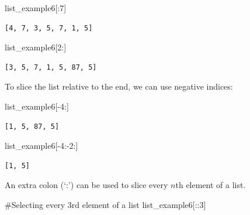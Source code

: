 \documentclass[
  letterpaper,
  DIV=11,
  numbers=noendperiod]{scrreprt}
\newenvironment{Shaded}{\begin{snugshade}}{\end{snugshade}}
\newcommand{\CommentTok}[1]{\textcolor[rgb]{0.37,0.37,0.37}{#1}}
\newcommand{\DecValTok}[1]{\textcolor[rgb]{0.68,0.00,0.00}{#1}}
\newcommand{\NormalTok}[1]{\textcolor[rgb]{0.00,0.23,0.31}{#1}}
\newcommand{\OperatorTok}[1]{\textcolor[rgb]{0.37,0.37,0.37}{#1}}
\begin{document}
\begin{Shaded}
\begin{Highlighting}[]
\NormalTok{list\_example6[:}\DecValTok{7}\NormalTok{]}
\end{Highlighting}
\end{Shaded}

\begin{verbatim}
[4, 7, 3, 5, 7, 1, 5]
\end{verbatim}

\begin{Shaded}
\begin{Highlighting}[]
\NormalTok{list\_example6[}\DecValTok{2}\NormalTok{:]}
\end{Highlighting}
\end{Shaded}

\begin{verbatim}
[3, 5, 7, 1, 5, 87, 5]
\end{verbatim}

To slice the list relative to the end, we can use negative indices:

\begin{Shaded}
\begin{Highlighting}[]
\NormalTok{list\_example6[}\OperatorTok{{-}}\DecValTok{4}\NormalTok{:]}
\end{Highlighting}
\end{Shaded}

\begin{verbatim}
[1, 5, 87, 5]
\end{verbatim}

\begin{Shaded}
\begin{Highlighting}[]
\NormalTok{list\_example6[}\OperatorTok{{-}}\DecValTok{4}\NormalTok{:}\OperatorTok{{-}}\DecValTok{2}\NormalTok{:]}
\end{Highlighting}
\end{Shaded}

\begin{verbatim}
[1, 5]
\end{verbatim}

An extra colon (`:') can be used to slice every \(n\)th element of a
list.

\begin{Shaded}
\begin{Highlighting}[]
\CommentTok{\#Selecting every 3rd element of a list}
\NormalTok{list\_example6[::}\DecValTok{3}\NormalTok{]}
\end{Highlighting}
\end{Shaded}
\end{document}
